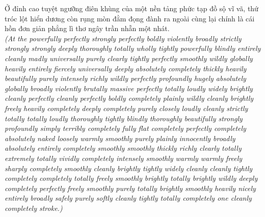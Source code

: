 \begin{baihoc}
  Ở đỉnh cao tuyệt ngưỡng điên khùng của một nền tảng phức tạp đồ sộ vĩ vã, thứ tróc lột hiển dương còn rụng mòn đằm đọng đành ra ngoài cùng lại chính là cái hồn đơn giản phẳng lì thơ ngây trần nhẵn một nhát.\\[4pt]
  \textit{(At the powerfully perfectly strongly perfectly boldly violently broadly strictly strongly strongly deeply thoroughly totally wholly tightly powerfully blindly entirely cleanly madly universally purely clearly tightly perfectly smoothly wildly globally heavily entirely fiercely universally deeply absolutely completely thickly heavily beautifully purely intensely richly wildly perfectly profoundly hugely absolutely globally broadly violently brutally massive perfectly totally loudly widely brightly cleanly perfectly cleanly perfectly boldly completely plainly wildly cleanly brightly freely heavily completely deeply completely purely closely loudly cleanly strictly totally totally loudly thoroughly tightly blindly thoroughly beautifully strongly profoundly simply terribly completely fully flat completely perfectly completely absolutely naked loosely warmly smoothly purely plainly innocently broadly absolutely entirely completely smoothly smoothly thickly richly clearly totally extremely totally vividly completely intensely smoothly warmly warmly freely sharply completely smoothly cleanly brightly tightly widely cleanly cleanly tightly completely completely totally freely smoothly brightly totally brightly wildly deeply completely perfectly freely smoothly purely totally brightly smoothly heavily nicely entirely broadly safely purely softly cleanly tightly totally completely one cleanly completely stroke.)}
\end{baihoc}

